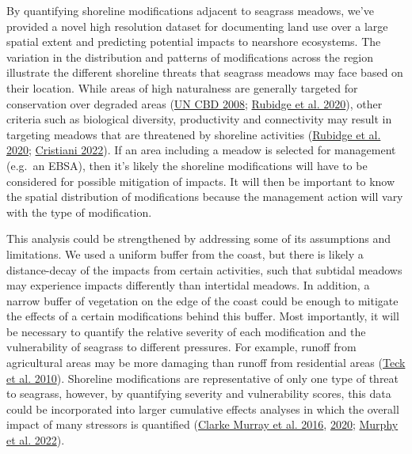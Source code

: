 \documentclass[12pt]{article}\usepackage[]{graphicx}\usepackage[]{color}
\begin{document}
By quantifying shoreline modifications adjacent to seagrass meadows, we've provided a novel high resolution dataset for documenting land use over a large spatial extent and predicting potential impacts to nearshore ecosystems. The variation in the distribution and patterns of modifications across the region illustrate the different shoreline threats that seagrass meadows may face based on their location. While areas of high naturalness are generally targeted for conservation over degraded areas (\protect\hyperlink{ref-UNCBD2008}{UN CBD 2008}; \protect\hyperlink{ref-Rubidge2020}{Rubidge et al. 2020}), other criteria such as biological diversity, productivity and connectivity may result in targeting meadows that are threatened by shoreline activities (\protect\hyperlink{ref-Rubidge2020}{Rubidge et al. 2020}; \protect\hyperlink{ref-cristiani2022}{Cristiani 2022}). If an area including a meadow is selected for management (e.g.~an EBSA), then it's likely the shoreline modifications will have to be considered for possible mitigation of impacts. It will then be important to know the spatial distribution of modifications because the management action will vary with the type of modification.

This analysis could be strengthened by addressing some of its assumptions and limitations. We used a uniform buffer from the coast, but there is likely a distance-decay of the impacts from certain activities, such that subtidal meadows may experience impacts differently than intertidal meadows. In addition, a narrow buffer of vegetation on the edge of the coast could be enough to mitigate the effects of a certain modifications behind this buffer. Most importantly, it will be necessary to quantify the relative severity of each modification and the vulnerability of seagrass to different pressures. For example, runoff from agricultural areas may be more damaging than runoff from residential areas (\protect\hyperlink{ref-Teck2010}{Teck et al. 2010}). Shoreline modifications are representative of only one type of threat to seagrass, however, by quantifying severity and vulnerability scores, this data could be incorporated into larger cumulative effects analyses in which the overall impact of many stressors is quantified (\protect\hyperlink{ref-ClarkeMurray2016}{Clarke Murray et al. 2016}, \protect\hyperlink{ref-ClarkeMurray2020}{2020}; \protect\hyperlink{ref-Murphy2022}{Murphy et al. 2022}).
\end{document}
